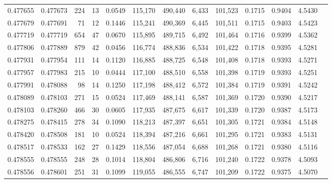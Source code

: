 \begin{tabular}{rrrrrrrrrrrrr}
0.477655 & 0.477673 &   224 &    13 &                                     0.0549 & 115,170 & 490,440 &   6,433 & 101,523 & 0.1715 & 0.9404 & 4.5430 \\
0.477679 & 0.477691 &    71 &    12 &                                     0.1446 & 115,241 & 490,369 &   6,445 & 101,511 & 0.1715 & 0.9403 & 4.5423 \\
0.477719 & 0.477719 &   654 &    47 &                                     0.0670 & 115,895 & 489,715 &   6,492 & 101,464 & 0.1716 & 0.9399 & 4.5362 \\
0.477806 & 0.477889 &   879 &    42 &                                     0.0456 & 116,774 & 488,836 &   6,534 & 101,422 & 0.1718 & 0.9395 & 4.5281 \\
0.477931 & 0.477954 &   111 &    14 &                                     0.1120 & 116,885 & 488,725 &   6,548 & 101,408 & 0.1718 & 0.9393 & 4.5271 \\
0.477957 & 0.477983 &   215 &    10 &                                     0.0444 & 117,100 & 488,510 &   6,558 & 101,398 & 0.1719 & 0.9393 & 4.5251 \\
0.477991 & 0.478088 &    98 &    14 &                                     0.1250 & 117,198 & 488,412 &   6,572 & 101,384 & 0.1719 & 0.9391 & 4.5242 \\
0.478089 & 0.478103 &   271 &    15 &                                     0.0524 & 117,469 & 488,141 &   6,587 & 101,369 & 0.1720 & 0.9390 & 4.5217 \\
0.478103 & 0.478260 &   466 &    30 &                                     0.0605 & 117,935 & 487,675 &   6,617 & 101,339 & 0.1720 & 0.9387 & 4.5173 \\
0.478275 & 0.478415 &   278 &    34 &                                     0.1090 & 118,213 & 487,397 &   6,651 & 101,305 & 0.1721 & 0.9384 & 4.5148 \\
0.478420 & 0.478508 &   181 &    10 &                                     0.0524 & 118,394 & 487,216 &   6,661 & 101,295 & 0.1721 & 0.9383 & 4.5131 \\
0.478517 & 0.478533 &   162 &    27 &                                     0.1429 & 118,556 & 487,054 &   6,688 & 101,268 & 0.1721 & 0.9380 & 4.5116 \\
0.478555 & 0.478555 &   248 &    28 &                                     0.1014 & 118,804 & 486,806 &   6,716 & 101,240 & 0.1722 & 0.9378 & 4.5093 \\
0.478556 & 0.478601 &   251 &    31 &                                     0.1099 & 119,055 & 486,555 &   6,747 & 101,209 & 0.1722 & 0.9375 & 4.5070 \\

\end{tabular}
